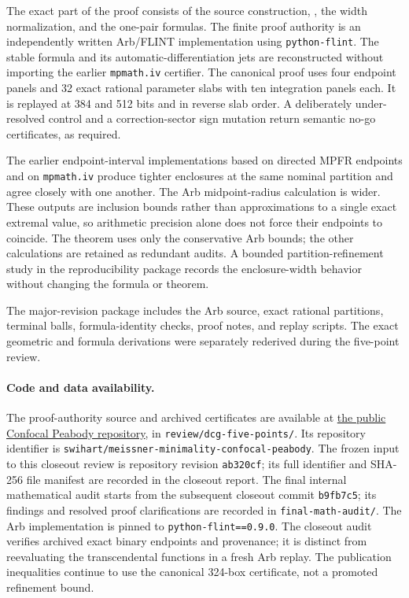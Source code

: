 \documentclass[11pt]{article}
\numberwithin{equation}{section}
\theoremstyle{remark}
\begin{document}
The exact part of the proof consists of the source construction, , the width normalization, and the one-pair formulas.  The finite proof authority is an independently written Arb/FLINT implementation using \texttt{python-flint}.  The stable formula and its automatic-differentiation jets are reconstructed without importing the earlier \texttt{mpmath.iv} certifier.  The canonical proof uses four endpoint panels and 32 exact rational parameter slabs with ten integration panels each.  It is replayed at 384 and 512 bits and in reverse slab order.  A deliberately under-resolved control and a correction-sector sign mutation return semantic no-go certificates, as required.

The earlier endpoint-interval implementations based on directed MPFR endpoints and on \texttt{mpmath.iv} produce tighter enclosures at the same nominal partition and agree closely with one another.  The Arb midpoint-radius calculation is wider.  These outputs are inclusion bounds rather than approximations to a single exact extremal value, so arithmetic precision alone does not force their endpoints to coincide.  The theorem uses only the conservative Arb bounds; the other calculations are retained as redundant audits.  A bounded partition-refinement study in the reproducibility package records the enclosure-width behavior without changing the formula or theorem.

The major-revision package includes the Arb source, exact rational partitions, terminal balls, formula-identity checks, proof notes, and replay scripts.  The exact geometric and formula derivations were separately rederived during the five-point review.

\paragraph{Code and data availability.}
The proof-authority source and archived certificates are available at
\href{https://github.com/swihart/meissner-minimality-confocal-peabody}{the public Confocal Peabody repository},
in \texttt{review/dcg-five-points/}. Its repository identifier is
\texttt{swihart/meissner-minimality-confocal-peabody}.
The frozen input to this closeout review is
repository revision \texttt{ab320cf}; its full identifier and SHA-256 file manifest
are recorded in the closeout report. The final internal mathematical audit
starts from the subsequent closeout commit \texttt{b9fb7c5}; its findings and
resolved proof clarifications are recorded in \texttt{final-math-audit/}.
The Arb implementation is pinned to
\texttt{python-flint==0.9.0}.  The closeout audit verifies archived exact binary
endpoints and provenance; it is distinct from reevaluating the transcendental
functions in a fresh Arb replay.  The publication inequalities continue to use
the canonical 324-box certificate, not a promoted refinement bound.
\end{document}
